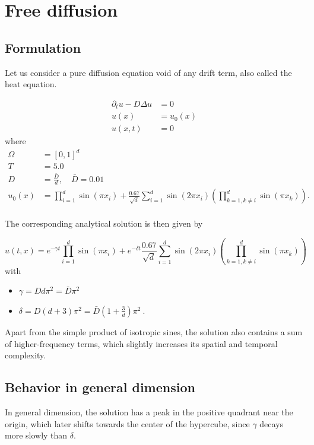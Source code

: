
\chapter{Free diffusion}

\section{Formulation}

Let us consider a pure diffusion equation void of any drift term, also called the heat equation.

\begin{align*}
\partial_t u - D \Delta u &= 0 \\
u(x) &= u_0(x) \\
u(x,t) &= 0
\end{align*}
where
\begin{align*}
\Omega &= [0,1]^d\\
T&=5.0 \\ 
D &= \frac{\bar{D}}{d}, \quad \bar{D}=0.01 \\ 
u_0(x) &=
\prod_{i=1}^d \sin(\pi x_i)
+
\frac{0.67}{\sqrt{d}}
\sum_{i=1}^d \sin(2\pi x_i) \left(\prod_{k=1,k\neq i}^d \sin(\pi x_k)\right).\\
\end{align*}


The corresponding analytical solution is then given by

$$
u(t,x) =
e^{-\gamma t}
\prod_{i=1}^d \sin(\pi x_i)
+
e^{-\delta t}
\frac{0.67}{\sqrt{d}}
\sum_{i=1}^d \sin(2\pi x_i) \left(\prod_{k=1,k\neq i}^d \sin(\pi x_k)\right)
$$
with
\begin{itemize}
\item $\gamma = D d \pi^2 = \bar{D} \pi^2$
\item $\delta = D (d+3) \pi^2 = \bar{D} (1+\frac{3}{d}) \pi^2\:$.
\end{itemize}


Apart from the simple product of isotropic sines,
the solution also contains a sum of higher-frequency terms,
which slightly increases its spatial and temporal complexity.


\section{Behavior in general dimension}

In general dimension, the solution has a peak in the positive quadrant near the origin,
which later shifts towards the center of the hypercube, since $\gamma$ decays more slowly than $\delta$.

